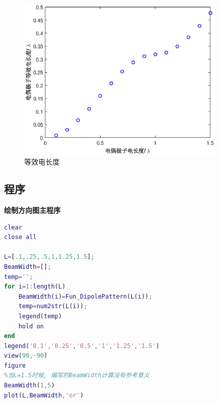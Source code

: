 \begin{figure}[hp]
\centering
\includegraphics[width=10cm]{Dipole_Eq_length.eps}
\caption{等效电长度} \label{fig:DP_EQ_L}
\end{figure}










\subsection{程序}
\noindent \textbf{绘制方向图主程序}
\begin{lstlisting}[language={matlab},keywordstyle=\color{blue!70},commentstyle=\color{red!50!green!50!blue!50},frame=shadowbox, rulesepcolor=\color{red!20!green!20!blue!20}] 
clear
close all

L=[.1,.25,.5,1,1.25,1.5];
BeamWidth=[];
temp='';
for i=1:length(L)
    BeamWidth(i)=Fun_DipolePattern(L(i));
    temp=num2str(L(i));
    legend(temp)   
    hold on 
end
legend('0.1','0.25','0.5','1','1.25','1.5')
view(90,-90)
figure
%当L=1.5时候, 编写的BeamWidth计算没有参考意义
BeamWidth(1,5)
plot(L,BeamWidth,'or')

\end{lstlisting}

